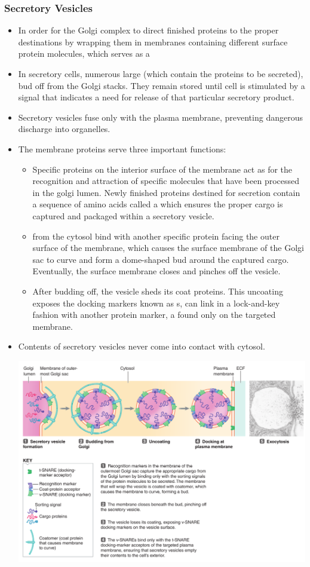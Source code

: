 \documentclass{article}
\numberwithin{equation}{section}
\begin{document}
\subsubsection{Secretory Vesicles}
\begin{itemize}
    \item In order for the Golgi complex to direct finished proteins to the proper destinations by wrapping them in membranes containing different surface protein molecules, which serves as a 
    \item In secretory cells, numerous large  (which contain the proteins to be secreted), bud off from the Golgi stacks. They remain stored until cell is stimulated by a signal that indicates a need for release of that particular secretory product.
    \item Secretory vesicles fuse only with the plasma membrane, preventing dangerous discharge into organelles.
    \item The membrane proteins serve three important functions:
    \begin{itemize}
        \item Specific proteins on the interior surface of the membrane act as  for the recognition and attraction of specific molecules that have been processed in the golgi lumen. Newly finished proteins destined for secretion contain a sequence of amino acids called a  which ensures the proper cargo is captured and packaged within a secretory vesicle.
        \item {} from the cytosol bind with another specific protein facing the outer surface of the membrane, which causes the surface membrane of the Golgi sac to curve and form a dome-shaped bud around the captured cargo. Eventually, the surface membrane closes and pinches off the vesicle.
        \item After budding off, the vesicle sheds its coat proteins. This uncoating exposes the docking markers known as s, can link in a lock-and-key fashion with another protein marker, a  found only on the targeted membrane.
    \end{itemize}
    \item Contents of secretory vesicles never come into contact with cytosol.
    \begin{center}
        \includegraphics[width=0.9\linewidth]{figures/secretory_vesicles.png}

\end{center}
\end{itemize}
\end{document}
